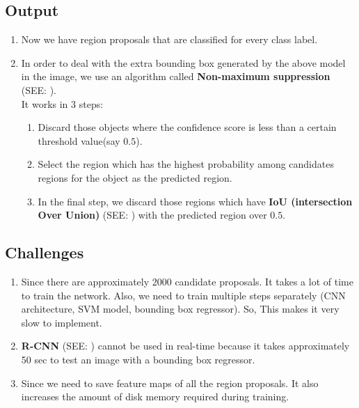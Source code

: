 \subsection*{Output}
\begin{enumerate}
    \item Now we have region proposals that are classified for every class label. 
    
    \item In order to deal with the extra bounding box generated by the above model in the image, we use an algorithm called \textbf{Non-maximum suppression} (SEE: ).\\
    It works in 3 steps:
    \begin{enumerate}
        \item Discard those objects where the confidence score is less than a certain threshold value(say $0.5$).

        \item Select the region which has the highest probability among candidates regions for the object as the predicted region.

        \item In the final step, we discard those regions which have \textbf{IoU (intersection Over Union)} (SEE: ) with the predicted region over $0.5$.

    \end{enumerate}
\end{enumerate}

\subsection*{Challenges}
\begin{enumerate}
    \item Since there are approximately 2000 candidate proposals. It takes a lot of time to train the network. Also, we need to train multiple steps separately (CNN architecture, SVM model, bounding box regressor). So, This makes it very slow to implement.

    \item \textbf{R-CNN} (SEE: ) cannot be used in real-time because it takes approximately 50 sec to test an image with a bounding box regressor.

    \item Since we need to save feature maps of all the region proposals. It also increases the amount of disk memory required during training.
\end{enumerate}


